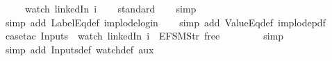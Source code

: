 \begin{isabellebody}
{\ \ \ \ \ {\isacharparenleft}watch\ linkedIn\ i{\isacharparenright}{\isachardoublequoteclose}%
}%
%
\isadelimproof
\ \ %
\endisadelimproof
%
\isatagproof
{}\isamarkupfalse%
\ standard\isanewline
\ \ \isamarkupfalse%
\ simp\isanewline
\ \ \isamarkupfalse%
\ {\isacharparenleft}simp\ add{\isacharcolon}\ LabelEq{\isacharunderscore}def\ implode{\isacharunderscore}login{\isacharparenright}\isanewline
\ \ \isamarkupfalse%
\ {\isacharparenleft}simp\ add{\isacharcolon}\ ValueEq{\isacharunderscore}def\ implode{\isacharunderscore}pdf{\isacharparenright}\isanewline
\ \ \isamarkupfalse%
\ {\isacharparenleft}case{\isacharunderscore}tac\ {\isachardoublequoteopen}Inputs\ {}\ {\isacharparenleft}watch\ linkedIn\ i{\isacharparenright}\ {\isacharequal}\ EFSM{\isachardot}Str\ {\isacharprime}{\isacharprime}free{\isacharprime}{\isacharprime}{\isachardoublequoteclose}{\isacharparenright}\isanewline
\ \ \ \isamarkupfalse%
\isanewline
\ \ \ \isamarkupfalse%
\ simp\isanewline
\ \ \isamarkupfalse%
\ {\isacharparenleft}simp\ add{\isacharcolon}\ Inputs{\isacharunderscore}def\ watch{\isacharunderscore}def\ aux{}{\isacharparenright}%
\endisatagproof
{\isafoldproof}%
%
\isadelimproof
%
\endisadelimproof
\isanewline
%
\isadelimtheory
%
\endisadelimtheory
%
\isatagtheory
{}\isamarkupfalse%
%
\endisatagtheory
{\isafoldtheory}%
%
\isadelimtheory
%
\endisadelimtheory
%
\end{isabellebody}%
\endinput
